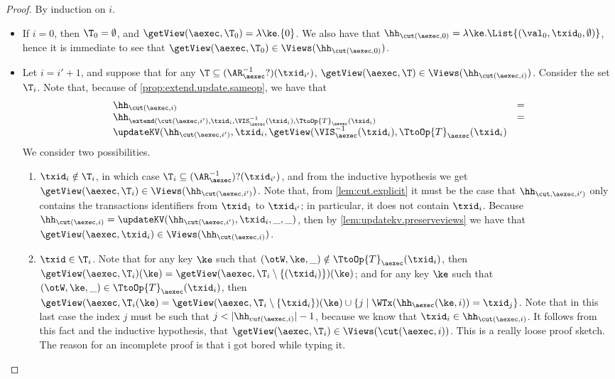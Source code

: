 \begin{proof}
By induction on $i$. 
\begin{itemize}
\item If $i = 0$, then $\T_{0} = \emptyset$, and $\getView(\aexec, \T_{0}) = \lambda \ke. \{0 \}$. 
We also have that $\hh_{\cut(\aexec, 0)} = \lambda \ke. \List{(\val_0, \txid_{0}, \emptyset)}$, hence 
it is immediate to see that $\getView(\aexec, \T_{0}) \in \Views(\hh_{\cut(\aexec, 0)})$.

\item Let $i = i'+1$, and suppose that for any $\T \subseteq (\AR_{\aexec}^{-1}?)(\txid_{i'})$, 
$\getView(\aexec, \T) \in \Views(\hh_{\cut(\aexec, i)})$. Consider the set $\T_{i}$.
Note that, because of \cref{prop:extend.update.sameop}, we have that
\[
\begin{array}{ll}
\hh_{\cut(\aexec, i)} &=\\ 
\hh_{\extend(\cut(\aexec, i'), \txid_{i}, \VIS^{-1}_{\aexec}(\txid_{i}), \TtoOp{T}_{\aexec}(\txid_{i})} &= \\
\updateKV(\hh_{\cut(\aexec, i')}, \txid_{i}, \getView(\VIS^{-1}_{\aexec}(\txid_{i}), \TtoOp{T}_{\aexec}(\txid_{i})
\end{array}
\]
We consider two possibilities.
\begin{enumerate}
\item $\txid_{i} \notin \T_{i}$, in which case $\T_{i} \subseteq (\AR_{\aexec}^{-1})?(\txid_{i'})$, 
and from the inductive hypothesis we get $\getView(\aexec, \T_{i}) \in \Views(\hh_{\cut(\aexec, i')})$. 
Note that, from \ref{lem:cut.explicit} it must be the case that $\hh_{\cut, \aexec, i')}$ only contains 
the transactions identifiers from $\txid_{1}$ to $\txid_{i'}$; in particular, it does not contain 
$\txid_{i}$. Because $\hh_{\cut(\aexec, i)} = \updateKV(\hh_{\cut(\aexec, i')}, \txid_{i}, \_, \_)$, 
then by \ref{lem:updatekv.preserveviews} we have that  
$\getView(\aexec, \txid_{i}) \in \Views(\hh_{\cut(\aexec, i)})$.

\item $\txid \in \T_{i}$. Note that for any key $\ke$ such that 
$(\otW, \ke, \_) \notin \TtoOp{T}_{\aexec}(\txid_{i})$, then 
$\getView(\aexec, \T_{i})(\ke) = \getView(\aexec, \T_{i} \setminus \{(\txid_{i})\})(\ke)$; 
and for any key $\ke$ such that $(\otW, \ke, \_) \in \TtoOp{T}_{\aexec}(\txid_{i})$, 
then $\getView(\aexec, \T_{i}(\ke) = \getView(\aexec, \T_{i} \setminus \{\txid_{i}\})(\ke) 
\cup \{j \mid \WTx(\hh_{\aexec}(\ke, i)) = \txid_{j}\}$. Note that in this last case the index 
$j$ must be such that $j < \lvert \hh_{cut(\aexec, i)} \rvert - 1$, because we know that 
$\txid_{i} \in \hh_{\cut(\aexec, i)}$. It follows from this fact and the inductive hypothesis, 
that $\getView(\aexec, \T_{i}) \in \Views(\cut(\aexec, i))$.
\ac{This is a really loose proof sketch. The reason for an incomplete proof is 
that i got bored while typing it.} 
\end{enumerate}
\end{itemize}
\end{proof}

